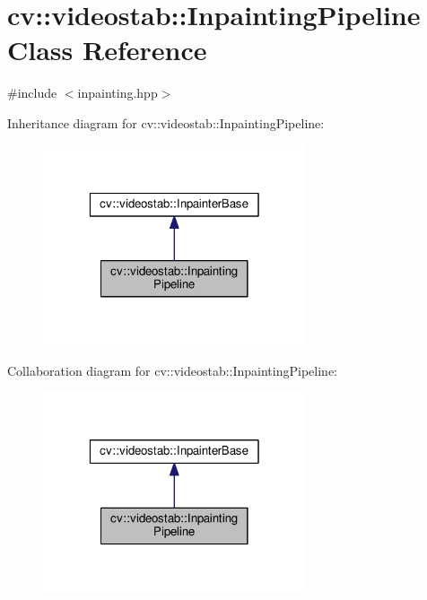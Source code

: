 \hypertarget{classcv_1_1videostab_1_1InpaintingPipeline}{\section{cv\-:\-:videostab\-:\-:Inpainting\-Pipeline Class Reference}
\label{classcv_1_1videostab_1_1InpaintingPipeline}
}


{\ttfamily \#include $<$inpainting.\-hpp$>$}



Inheritance diagram for cv\-:\-:videostab\-:\-:Inpainting\-Pipeline\-:\nopagebreak
\begin{figure}[H]
\begin{center}
\leavevmode
\includegraphics[width=220pt]{classcv_1_1videostab_1_1InpaintingPipeline__inherit__graph}
\end{center}
\end{figure}


Collaboration diagram for cv\-:\-:videostab\-:\-:Inpainting\-Pipeline\-:\nopagebreak
\begin{figure}[H]
\begin{center}
\leavevmode
\includegraphics[width=220pt]{classcv_1_1videostab_1_1InpaintingPipeline__coll__graph}
\end{center}
\end{figure}
